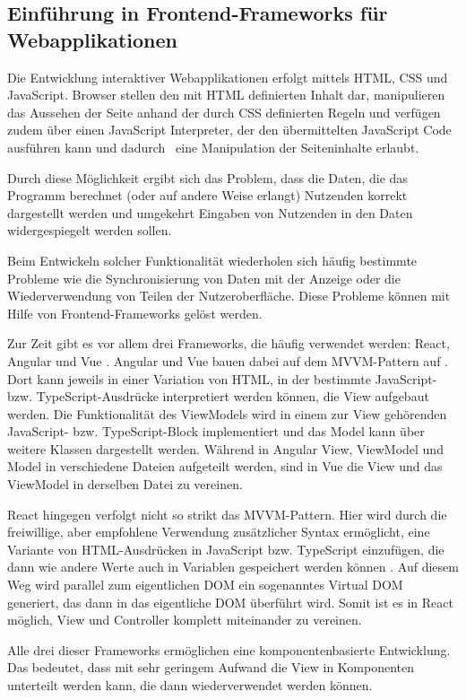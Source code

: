 \subsection{Einführung in Frontend-Frameworks für Webapplikationen}
Die Entwicklung interaktiver Webapplikationen erfolgt mittels HTML, CSS und JavaScript. Browser stellen den mit HTML definierten Inhalt dar, manipulieren das Aussehen der Seite anhand der durch CSS definierten Regeln und verfügen zudem über einen JavaScript Interpreter, der den übermittelten JavaScript Code ausführen kann und dadurch~ eine Manipulation der Seiteninhalte erlaubt.

Durch diese Möglichkeit ergibt sich das Problem, dass die Daten, die das Programm berechnet (oder auf andere Weise erlangt) Nutzenden korrekt dargestellt werden und umgekehrt Eingaben von Nutzenden in den Daten widergespiegelt werden sollen.

Beim Entwickeln solcher Funktionalität wiederholen sich häufig bestimmte Probleme wie die Synchronisierung von Daten mit der Anzeige oder die Wiederverwendung von Teilen der Nutzeroberfläche. Diese Probleme können mit Hilfe von Frontend-Frameworks gelöst werden.

Zur Zeit gibt es vor allem drei Frameworks, die häufig verwendet werden: React, Angular und Vue \cite{stateofjs}. Angular und Vue bauen dabei auf dem \gls{MVVM}-Pattern auf \cite{angular_mvvm}. Dort kann jeweils in einer Variation von HTML, in der bestimmte JavaScript- bzw. TypeScript-Ausdrücke interpretiert werden können, die View aufgebaut werden. Die Funktionalität des ViewModels wird in einem zur View gehörenden JavaScript- bzw. TypeScript-Block implementiert und das Model kann über weitere Klassen dargestellt werden. Während in Angular View, ViewModel und Model in verschiedene Dateien aufgeteilt werden, sind in Vue die View und das ViewModel in derselben Datei zu vereinen.

React hingegen verfolgt nicht so strikt das \gls{MVVM}-Pattern. Hier wird durch die freiwillige, aber empfohlene Verwendung zusätzlicher Syntax ermöglicht, eine Variante von HTML-Ausdrücken in JavaScript bzw. TypeScript einzufügen, die dann wie andere Werte auch in Variablen gespeichert werden können \cite{react_jsx}. Auf diesem Weg wird parallel zum eigentlichen \gls{DOM} ein sogenanntes Virtual \gls{DOM} generiert, das dann in das eigentliche \gls{DOM} überführt wird. Somit ist es in React möglich, View und Controller komplett miteinander zu vereinen.

Alle drei dieser Frameworks ermöglichen eine komponentenbasierte Entwicklung. Das bedeutet, dass mit sehr geringem Aufwand die View in Komponenten unterteilt werden kann, die dann wiederverwendet werden können.

